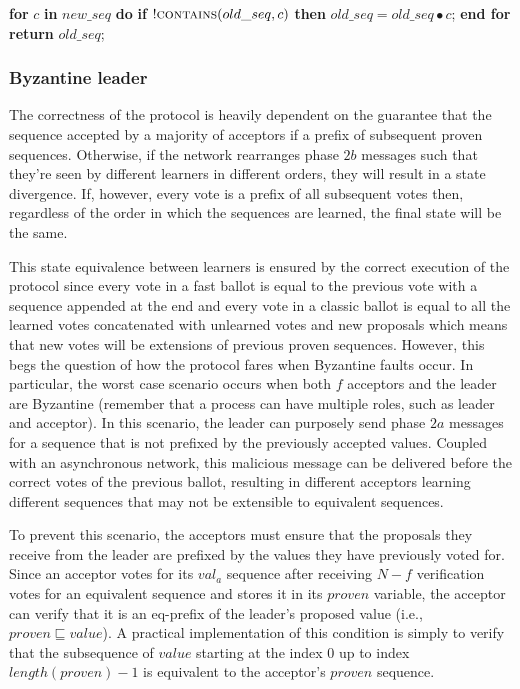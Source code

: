 \begin{algorithm}
\begin{algorithmic}[1]
		\State		
		\State \textbf{for} $c$ \textbf{in} $new\_seq$ \textbf{do} 
		\State \hspace{\algorithmicindent} \textbf{if} $!\Call{contains}{old\_seq,c}$ \textbf{then}
		\State \hspace{\algorithmicindent}\hspace{\algorithmicindent}\hspace{\algorithmicindent} $old\_seq =  old\_seq \bullet c$;
		\State \textbf{end for}
		\State \textbf{return} $old\_seq$;
		\EndFunction
	\end{algorithmic}
\end{algorithm}

\subsubsection{Byzantine leader}
The correctness of the protocol is heavily dependent on the guarantee that the sequence accepted by a majority of acceptors if a prefix of subsequent proven sequences. Otherwise, if the network rearranges phase $2b$ messages such that they're seen by different learners in different orders, they will result in a state divergence. If, however, every vote is a prefix of all subsequent votes then, regardless of the order in which the sequences are learned, the final state will be the same. \par 
This state equivalence between learners is ensured by the correct execution of the protocol since every vote in a fast ballot is equal to the previous vote with a sequence appended at the end and every vote in a classic ballot is equal to all the learned votes concatenated with unlearned votes and new proposals which means that new votes will be extensions of previous proven sequences. However, this begs the question of how the protocol fares when Byzantine faults occur. In particular, the worst case scenario occurs when both $f$ acceptors and the leader are Byzantine (remember that a process can have multiple roles, such as leader and acceptor). In this scenario, the leader can purposely send phase $2a$ messages for a sequence that is not prefixed by the previously accepted values. Coupled with an asynchronous network, this malicious message can be delivered before the correct votes of the previous ballot, resulting in different acceptors learning different sequences that may not be extensible to equivalent sequences. \par
To prevent this scenario, the acceptors must ensure that the proposals they receive from the leader are prefixed by the values they have previously voted for. Since an acceptor votes for its $val_a$ sequence after receiving $N-f$ verification votes for an equivalent sequence and stores it in its $proven$ variable, the acceptor can verify that it is an eq-prefix of the leader's proposed value (i.e., $proven \sqsubseteq value$). A practical implementation of this condition is simply to verify that the  subsequence of $value$ starting at the index $0$ up to index $length(proven)-1$ is equivalent to the acceptor's $proven$ sequence. 

